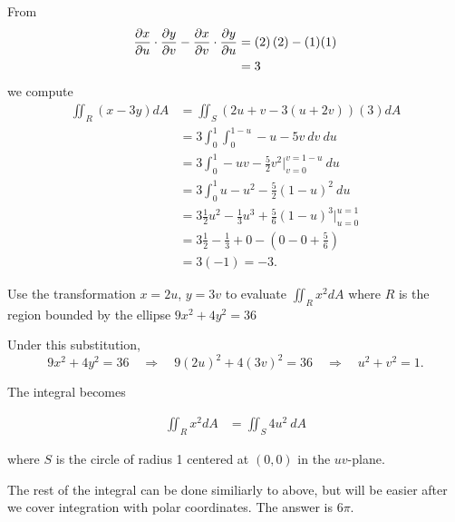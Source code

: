\documentclass[12pt]{exam}
\begin{document}
\begin{questions}
\begin{solution}
\begin{center}
            \end{center}

        From 
        \begin{align*}
            \dfrac{\partial x}{\partial u}\cdot\dfrac{\partial y}{\partial v}-\dfrac{\partial x}{\partial v}\cdot\dfrac{\partial y}{\partial u} & = \left(2\right)(2)-(1)(1)\\
                &= 3 
        \end{align*}
        we compute
            \begin{align*}
                \iint_R(x-3y)dA & = \iint_{S}(2u+v-3(u+2v))(3)dA\\
                    &= 3\int_{0}^1\int_{0}^{1-u}-u-5v~dv~du\\
                    &= 3\int_0^1 -uv-\frac{5}{2}v^2|_{v=0}^{v=1-u}~du\\
                    &= 3\int_0^1 u-u^2-\frac{5}{2}(1-u)^2~du\\
                    &= 3\frac{1}{2}u^2-\frac{1}{3}u^3+\frac{5}{6}(1-u)^3|_{u=0}^{u=1}\\
                    &= 3\frac{1}{2}-\frac{1}{3}+0- \left( 0-0+\frac{5}{6}\right)\\
                    &= 3(-1)=-3.
            \end{align*}
        \end{solution}
    \else
        \vfill
    \fi

\question Use the transformation \(x=2u\), \(y=3v\) to evaluate \(\iint_R x^2 dA\) where \(R\) is the region bounded by the ellipse \(9x^2+4y^2=36\) 
\ifprintanswers
        \begin{solution}
            Under this substitution, 
            \[
                9x^2+4y^2=36 \quad\Rightarrow\quad 9(2u)^2+4(3v)^2 = 36 \quad\Rightarrow\quad u^2+v^2=1.
            \]

            The integral becomes

            \begin{align*}
                \iint_R x^2 dA & = \iint_{S} 4u^2 ~dA
            \end{align*}

            where \(S\) is the circle of radius 1 centered at \((0,0)\) in the \(uv\)-plane.

            The rest of the integral can be done similiarly to above, but will be easier after we cover integration with polar coordinates.
            The answer is \(6\pi\).
        \end{solution}
    \else
        \vfill
    \fi

\end{questions}
\end{document}
